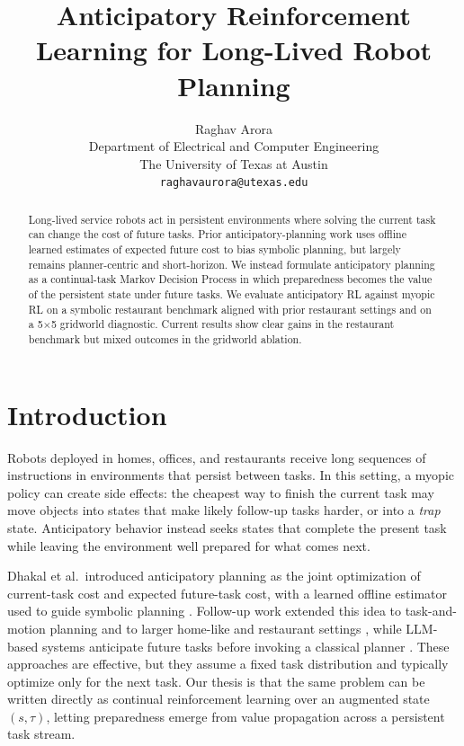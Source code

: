 \documentclass{article}
\title{Anticipatory Reinforcement Learning for Long-Lived Robot Planning}
\author{%
  Raghav Arora \\
  Department of Electrical and Computer Engineering \\
  The University of Texas at Austin \\
  \texttt{raghavaurora@utexas.edu}
}
\begin{document}
\maketitle

\begin{abstract}
Long-lived service robots act in persistent environments where solving the current task can change the cost of future tasks. Prior anticipatory-planning work uses offline learned estimates of expected future cost to bias symbolic planning, but largely remains planner-centric and short-horizon. We instead formulate anticipatory planning as a continual-task Markov Decision Process in which preparedness becomes the value of the persistent state under future tasks. We evaluate anticipatory RL against myopic RL on a symbolic restaurant benchmark aligned with prior restaurant settings and on a 5$\times$5 gridworld diagnostic. Current results show clear gains in the restaurant benchmark but mixed outcomes in the gridworld ablation.
\end{abstract}

\section{Introduction}
Robots deployed in homes, offices, and restaurants receive long sequences of instructions in environments that persist between tasks. In this setting, a myopic policy can create side effects: the cheapest way to finish the current task may move objects into states that make likely follow-up tasks harder, or into a \textit{trap} state. Anticipatory behavior instead seeks states that complete the present task while leaving the environment well prepared for what comes next.

Dhakal et al.\ introduced anticipatory planning as the joint optimization of current-task cost and expected future-task cost, with a learned offline estimator used to guide symbolic planning \cite{dhakal2023anticipatory}. Follow-up work extended this idea to task-and-motion planning \cite{dhakal2024tamp} and to larger home-like and restaurant settings \cite{talukder2024large}, while LLM-based systems anticipate future tasks before invoking a classical planner \cite{arora2024anticipate,singh2024anticipate}. These approaches are effective, but they assume a fixed task distribution and typically optimize only for the next task. Our thesis is that the same problem can be written directly as continual reinforcement learning over an augmented state $(s,\tau)$, letting preparedness emerge from value propagation across a persistent task stream.
\end{document}
